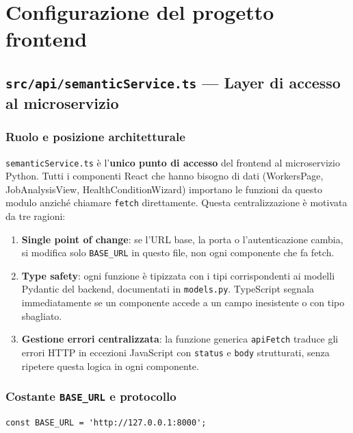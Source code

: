 \documentclass[a4paper,12pt]{article}
\begin{document}
\section{Configurazione del progetto frontend}

\subsection{\texttt{src/api/\allowbreak{}semanticService.ts} --- Layer di accesso al microservizio}

\subsubsection{Ruolo e posizione architetturale}

\texttt{semanticService.ts} \`{e} l'\textbf{unico punto di accesso} del
frontend al microservizio Python. Tutti i componenti React che hanno
bisogno di dati (WorkersPage, JobAnalysisView, HealthConditionWizard)
importano le funzioni da questo modulo anzich\'{e} chiamare \texttt{fetch}
direttamente. Questa centralizzazione \`{e} motivata da tre ragioni:

\begin{enumerate}
  \item \textbf{Single point of change}: se l'URL base, la porta o
        l'autenticazione cambia, si modifica solo \texttt{BASE\_URL}
        in questo file, non ogni componente che fa fetch.
  \item \textbf{Type safety}: ogni funzione \`{e} tipizzata con i tipi
        corrispondenti ai modelli Pydantic del backend, documentati in
        \texttt{models.py}. TypeScript segnala immediatamente se un
        componente accede a un campo inesistente o con tipo sbagliato.
  \item \textbf{Gestione errori centralizzata}: la funzione generica
        \texttt{apiFetch} traduce gli errori HTTP in eccezioni JavaScript
        con \texttt{status} e \texttt{body} strutturati, senza ripetere
        questa logica in ogni componente.
\end{enumerate}

\subsubsection{Costante \texttt{BASE\_URL} e protocollo}

\begin{lstlisting}
const BASE_URL = 'http://127.0.0.1:8000';
\end{lstlisting}
\end{document}
